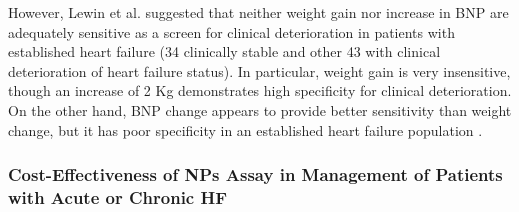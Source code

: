 \documentclass[14pt,a4paper,onecolumn]{extarticle}
\begin{document}
However, Lewin et al.  suggested that neither weight gain nor increase in BNP are adequately sensitive as a screen for clinical deterioration in patients with established heart failure (34 clinically stable and other 43 with clinical deterioration of heart failure status). In particular, weight gain is very insensitive, though an increase of 2 Kg demonstrates high specificity for clinical deterioration. On the other hand, BNP change appears to provide better sensitivity than weight change, but it has poor specificity in an established heart failure population \citep{bib3295}.









\subsubsection{ Cost-Effectiveness of NPs Assay in Management of Patients with Acute or Chronic HF}



\end{document}
